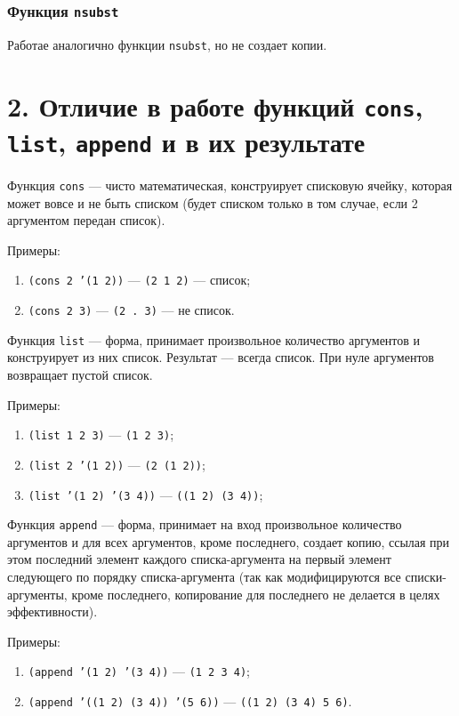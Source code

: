 \subsubsection*{Функция \texttt{nsubst}}

Работае аналогично функции \texttt{nsubst}, но не создает копии.

\section*{2. Отличие в работе функций \texttt{cons}, \texttt{list}, \texttt{append} и в их результате}

Функция \texttt{cons} --- чисто математическая, конструирует списковую ячейку, которая может вовсе и не быть списком (будет списком только в том случае, если 2 аргументом передан список).

Примеры:
\begin{enumerate}
	\item \texttt{(cons 2 '(1 2))} --- \texttt{(2 1 2)} --- список;
	\item \texttt{(cons 2 3)} --- \texttt{(2 . 3)} --- не список.
\end{enumerate}

Функция \texttt{list} --- форма, принимает произвольное количество аргументов и конструирует из них список. Результат --- всегда список. При нуле аргументов возвращает пустой список.

Примеры:
\begin{enumerate}
	\item \texttt{(list 1 2 3)} --- \texttt{(1 2 3)};
	\item \texttt{(list 2 '(1 2))} --- \texttt{(2 (1 2))};
	\item \texttt{(list '(1 2) '(3 4))} --- \texttt{((1 2) (3 4))};
\end{enumerate}

Функция \texttt{append} --- форма, принимает на вход произвольное количество аргументов и для всех аргументов, кроме последнего, создает копию, ссылая при этом последний элемент каждого списка-аргумента на первый элемент следующего по порядку списка-аргумента (так как модифицируются все списки-аргументы, кроме последнего, копирование для последнего не делается в целях эффективности).

Примеры:
\begin{enumerate}
	\item \texttt{(append '(1 2) '(3 4))} --- \texttt{(1 2 3 4)};
	\item \texttt{(append '((1 2) (3 4)) '(5 6))} --- \texttt{((1 2) (3 4) 5 6)}.
\end{enumerate}